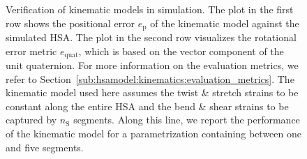 \begin{figure}[t]
    \centering
    
    \caption{Verification of kinematic models in simulation. 
    The plot in the first row shows the positional error $e_\mathrm{p}$ of the kinematic model against the simulated HSA. The plot in the second row visualizes the rotational error metric $e_\mathrm{quat}$, which is based on the vector component of the unit quaternion. For more information on the evaluation metrics, we refer to Section~\ref{sub:hsamodel:kinematics:evaluation_metrics}.
    The kinematic model used here assumes the twist \& stretch strains to be constant along the entire HSA and the bend \& shear strains to be captured by $n_\mathrm{S}$ segments.
    Along this line, we report the performance of the kinematic model for a parametrization containing between one and five segments.
    }\label{fig:hsamodel:simulation_kinematic_error_vs_number_of_PCS_segments}
\end{figure}


